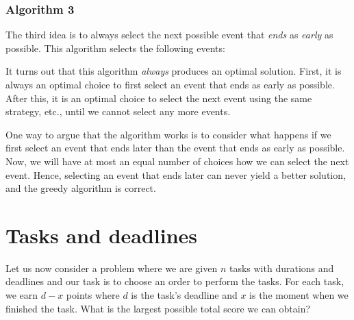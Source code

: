 \subsubsection*{Algorithm 3}

The third idea is to always select the next
possible event that \emph{ends} as \emph{early} as possible.
This algorithm selects the following events: 
\begin{center}
\end{center}

It turns out that this algorithm
\emph{always} produces an optimal solution.
First, it is always an optimal choice
to first select an event that ends
as early as possible.
After this, it is an optimal choice
to select the next event
using the same strategy, etc.,
until we cannot select any more events.

One way to argue that the algorithm works
is to consider
what happens if we first select an event
that ends later than the event that ends
as early as possible.
Now, we will have at most an equal number of
choices how we can select the next event.
Hence, selecting an event that ends later
can never yield a better solution,
and the greedy algorithm is correct.

\section{Tasks and deadlines}

Let us now consider a problem where
we are given $n$ tasks with durations and deadlines
and our task is to choose an order to perform the tasks.
For each task, we earn $d-x$ points
where $d$ is the task's deadline
and $x$ is the moment when we finished the task.
What is the largest possible total score
we can obtain?


